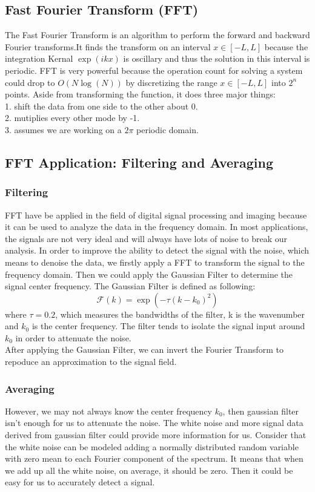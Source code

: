 \documentclass[12pt,letterpaper]{article}
\begin{document}
\subsection*{Fast Fourier Transform (FFT)}
The Fast Fourier Transform is an algorithm to perform the forward and backward Fourier transforms.It finds the transform on an interval $x \in [-L,L]$ because the integration Kernal $\exp(ikx)$ is oscillary and thus the solution in this interval is periodic. FFT is very powerful because the operation count for solving a system could drop to $O(N\log(N))$ by discretizing the range  $x \in [-L,L]$  into $2^n$ points. Aside from transforming the function, it does three major things:
\\1. shift the data from one side to the other about 0. 
\\2. mutiplies every other mode by -1.
\\3. assumes we are working on a $2\pi$ periodic domain. 

\subsection*{FFT Application: Filtering and Averaging}
\subsubsection*{Filtering}
FFT have be applied in the field of digital signal processing and imaging because it can be used to analyze the data in the frequency domain. In most applications, the signals are not very ideal and will always have lots of noise to break our analysis. In order to improve the ability to detect the signal with the noise, which means to denoise the data, we firstly apply a FFT to transform the signal to the frequency domain. Then we could apply the Gaussian Filter to determine the signal center frequency. The Gaussian Filter is defined as following:
$$\mathcal{F}(k) = \exp(-\tau(k-k_0)^2)$$
where $\tau = 0.2$, which measures the bandwidths of the filter, k is the wavenumber and $k_0$ is the center frequency. The filter tends to isolate the signal input around $k_0$ in order to attenuate the noise. 
\\After applying the Gaussian Filter, we can invert the Fourier Transform to repoduce an approximation to the signal field. 
\subsubsection*{Averaging}
However, we may not always know the center frequency $k_0$, then gaussian filter isn't enough for us to attenuate the noise. The white noise and more signal data derived from gaussian filter could provide more information for us. Consider that the white noise can be modeled adding a normally distributed random variable with zero mean to each Fourier component of the spectrum. It means that when we add up all the white noise, on average, it should be zero. Then it could be easy for us to accurately detect a signal. 
\end{document}
